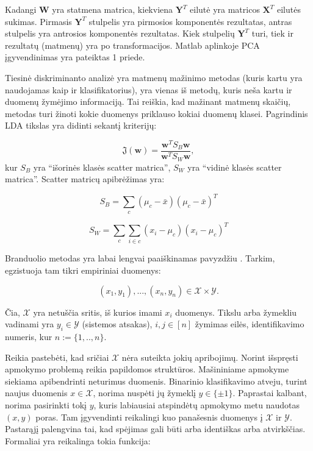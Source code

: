 \documentclass[]{vgtuef}
\begin{document}
Kadangi $\textbf{W}$ yra statmena matrica, kiekviena $\textbf{Y}^T$ eilutė yra matricos $\textbf{X}^T$ eilutės sukimas. Pirmasis $\textbf{Y}^T$ stulpelis yra pirmosios komponentės rezultatas, antras stulpelis yra antrosios komponentės rezultatas. Kiek stulpelių $\textbf{Y}^T$ turi, tiek ir rezultatų (matmenų) yra po transformacijos. Matlab aplinkoje PCA įgyvendinimas yra pateiktas 1 priede.

Tiesinė diskriminanto analizė \cite{welling2005fisher} yra matmenų mažinimo metodas (kuris kartu yra naudojamas kaip ir klasifikatorius), yra vienas iš metodų, kuris neša kartu ir duomenų žymėjimo informaciją. Tai reiškia, kad mažinant matmenų skaičių, metodas turi žinoti kokie duomenys priklauso kokiai duomenų klasei. Pagrindinis LDA tikslas yra didinti sekantį kriterijų:

\begin{equation}
  \mathfrak{J}(\mathbf{w}) = \frac{ \mathbf{w}^T S_B \mathbf{w} }{
    \mathbf{w}^T S_W \mathbf{w} },
\end{equation}
kur $S_B$ yra ``išorinės klasės scatter matrica'', $S_W$ yra ``vidinė klasės scatter matrica''. Scatter matricų apibrėžimas yra:

\begin{equation}
  S_B = \sum_c (\mu_c - \bar{x})(\mu_c - \bar{x})^T
\end{equation}

\begin{equation}
  S_W = \sum_c \sum_{i \in c} ( x_i - \mu_c)(x_i - \mu_c)^T
\end{equation}


Branduolio metodas yra labai lengvai paaiškinamas pavyzdžiu \cite{2007math......1907H}. Tarkim, egzistuoja tam tikri empiriniai duomenys:

\begin{equation}
  (x_1,y_1),...,(x_n,y_n) \in \mathcal{X} \times \mathcal{Y}.
\end{equation}

Čia, $\mathcal{X}$ yra netuščia sritis, iš kurios imami $x_i$ duomenys. Tikslu arba žymekliu vadinami yra $y_i \in \mathcal{Y}$ (sistemos atsakas), $i,j \in [n]$ žymimas eilės, identifikavimo numeris, kur $n := \{1,..,n\}$.

Reikia pastebėti, kad sričiai $\mathcal{X}$ nėra suteikta jokių apribojimų. Norint išspręsti apmokymo problemą reikia papildomos struktūros. Mašininiame apmokyme siekiama apibendrinti neturimus duomenis. Binarinio klasifikavimo atveju, turint naujus duomenis $x \in \mathcal{X}$, norima nuspėti jų žymeklį $y \in \{\pm 1\}$. Paprastai kalbant, norima pasirinkti tokį $y$, kuris labiausiai atspindėtų apmokymo metu naudotas $(x,y)$ poras. Tam įgyvendinti reikalingi kuo panašesnis duomenys į $\mathcal{X}$ ir $\mathcal{Y}$. Pastarąjį palengvina tai, kad spėjimas gali būti arba identiškas arba atvirkščias. Formaliai yra reikalinga tokia funkcija:
\end{document}
